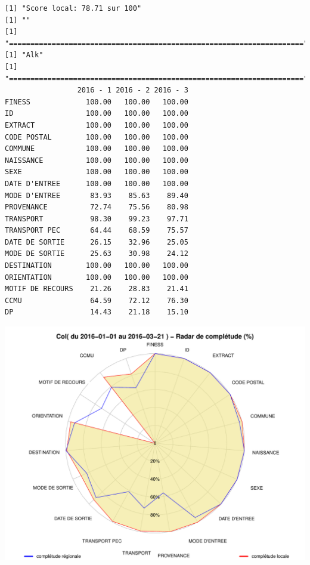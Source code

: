 \documentclass[]{article}
\begin{document}
\begin{verbatim}
[1] "Score local: 78.71 sur 100"
[1] ""
[1] "====================================================================="
[1] "Alk"
[1] "====================================================================="
                 2016 - 1 2016 - 2 2016 - 3
FINESS             100.00   100.00   100.00
ID                 100.00   100.00   100.00
EXTRACT            100.00   100.00   100.00
CODE POSTAL        100.00   100.00   100.00
COMMUNE            100.00   100.00   100.00
NAISSANCE          100.00   100.00   100.00
SEXE               100.00   100.00   100.00
DATE D'ENTREE      100.00   100.00   100.00
MODE D'ENTREE       83.93    85.63    89.40
PROVENANCE          72.74    75.56    80.98
TRANSPORT           98.30    99.23    97.71
TRANSPORT PEC       64.44    68.59    75.57
DATE DE SORTIE      26.15    32.96    25.05
MODE DE SORTIE      25.63    30.98    24.12
DESTINATION        100.00   100.00   100.00
ORIENTATION        100.00   100.00   100.00
MOTIF DE RECOURS    21.26    28.83    21.41
CCMU                64.59    72.12    76.30
DP                  14.43    21.18    15.10
\end{verbatim}

\includegraphics{completude_files/figure-latex/finess-15.pdf}
\end{document}
